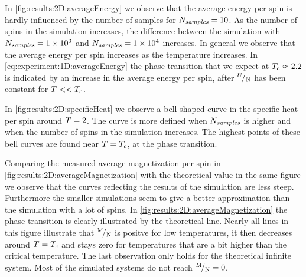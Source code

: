 	In \cref{fig:results:2D:averageEnergy} we observe that the average energy per spin is hardly influenced by the number of samples for $N_\textit{samples} = 10$. As the number of spins in the simulation increases, the difference between the simulation with $N_\textit{samples} = \num{1.e+3}$ and $N_\textit{samples} = \num{1.e+4}$ increases. In general we observe that the average energy per spin increases as the temperature increases. In \cref{eq:experiment:1D:averageEnergy} the phase transition that we expect at $T_{c} \approx \num{2.2}$ is indicated by an increase in the average energy per spin, after ${}^{U}\!/_{\mathrm{N}}$ has been constant for $T << T_{c}$. 

	In \cref{fig:results:2D:specificHeat} we observe a bell-shaped curve in the specific heat per spin around $T = 2$. The curve is more defined when $N_\textit{samples}$ is higher and when the number of spins in the simulation increases. The highest points of these bell curves are found near $T = T_{c}$, \ie at the phase transition.

	Comparing the measured average magnetization per spin in \cref{fig:results:2D:averageMagnetization} with the theoretical value in the same figure we observe that the curves reflecting the results of the simulation are less steep. Furthermore the smaller simulations seem to give a better approximation than the simulation with a lot of spins. In \cref{fig:results:2D:averageMagnetization} the phase transition is clearly illustrated by the theoretical line. Nearly all lines in this figure illustrate that ${}^{\mathrm{M}}\!/_{\mathrm{N}}$ is positve for low temperatures, it then decreases around $T = T_{c}$ and stays zero for temperatures that are a bit higher than the critical temperature. The last observation only holds for the theoretical infinite system. Most of the simulated systems do not reach ${}^{\mathrm{M}}\!/_{\mathrm{N}} = 0$.

